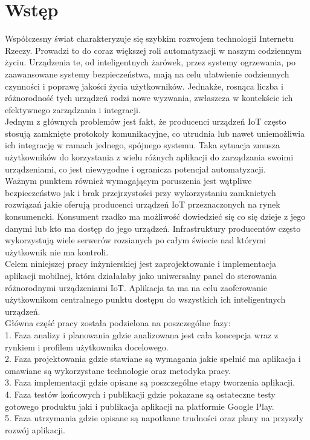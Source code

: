 \section{Wstęp}
Współczesny świat charakteryzuje się szybkim rozwojem technologii Internetu Rzeczy. Prowadzi to do coraz większej roli automatyzacji w naszym codziennym życiu. Urządzenia te, od inteligentnych żarówek, przez systemy ogrzewania, po zaawansowane systemy bezpieczeństwa, mają na celu ułatwienie codziennych czynności i poprawę jakości życia użytkowników. Jednakże, rosnąca liczba i różnorodność tych urządzeń rodzi nowe wyzwania, zwłaszcza w kontekście ich efektywnego zarządzania i integracji.\\

Jednym z głównych problemów jest fakt, że producenci urządzeń IoT często stosują zamknięte protokoły komunikacyjne, co utrudnia lub nawet uniemożliwia ich integrację w ramach jednego, spójnego systemu. Taka sytuacja zmusza użytkowników do korzystania z wielu różnych aplikacji do zarządzania swoimi urządzeniami, co jest niewygodne i ogranicza potencjał automatyzacji.\\

Ważnym punktem również wymagającym poruszenia jest wątpliwe bezpieczeństwo jak i brak przejrzystości przy wykorzystaniu zamknietych rozwiązań jakie oferują producenci urządzeń IoT przeznaczonych na rynek konsumencki. Konsument rzadko ma możliwość dowiedzieć się co się dzieje z jego danymi lub kto ma dostęp do jego urządzeń. Infrastruktury producentów często wykorzystują wiele serwerów rozsianych po całym świecie nad którymi użytkownik nie ma kontroli.\\

Celem niniejszej pracy inżynierskiej jest zaprojektowanie i implementacja aplikacji mobilnej, która działałaby jako uniwersalny panel do sterowania różnorodnymi urządzeniami IoT. Aplikacja ta ma na celu zaoferowanie użytkownikom centralnego punktu dostępu do wszystkich ich inteligentnych urządzeń.\\

Główna część pracy została podzielona na poszczególne fazy:\\

1. Faza analizy i planowania gdzie analizowana jest cała koncepcja wraz z rynkiem i profilem użytkownika docelowego.\\

2. Faza projektowania gdzie stawiane są wymagania jakie spełnić ma aplikacja i omawiane są wykorzystane technologie oraz metodyka pracy.\\

3. Faza implementacji gdzie opisane są poszczególne etapy tworzenia aplikacji.\\

4. Faza testów końcowych i publikacji gdzie pokazane są ostateczne testy gotowego produktu jaki i publikacja aplikacji na platformie Google Play.\\

5. Faza utrzymania gdzie opisane są napotkane trudności oraz plany na przyszły rozwój aplikacji.\\